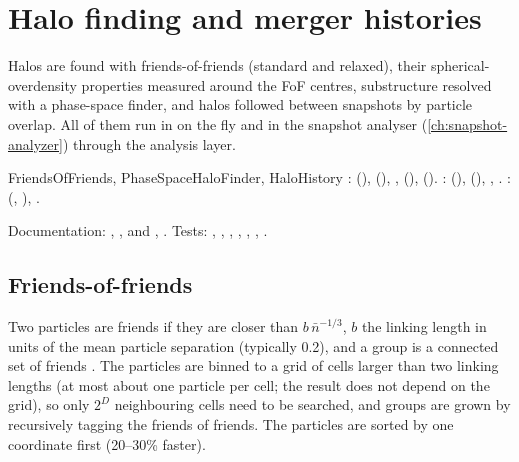 \chapter{Halo finding and merger histories}\label{ch:halo-finding}

Halos are found with friends-of-friends (standard and relaxed), their spherical-overdensity properties measured around
the FoF centres, substructure resolved with a phase-space finder, and halos followed between snapshots by particle
overlap. All of them run in  on the fly and in the snapshot analyser (\cref{ch:snapshot-analyzer})
through the analysis layer.

\begin{modulebox}{FriendsOfFriends, PhaseSpaceHaloFinder, HaloHistory}
:  (), 
(), , 
(),  ().
:  (), 
(), , .
:  (, ), .\par
Documentation: , ,
 and , .
Tests: , , , ,
, , .
\end{modulebox}

\section{Friends-of-friends}\label{sec:halo-fof}

Two particles are friends if they are closer than $b\,\bar n^{-1/3}$, $b$ the linking length in units of the mean particle
separation (typically 0.2), and a group is a connected set of friends \cite{Davis1985}. The particles are binned to a grid of
cells larger than two linking lengths (at most about one particle per cell; the result does not depend on the grid), so only
$2^D$ neighbouring cells need to be searched, and groups are grown by recursively tagging the friends of friends. The particles
are sorted by one coordinate first (20--30\% faster).

